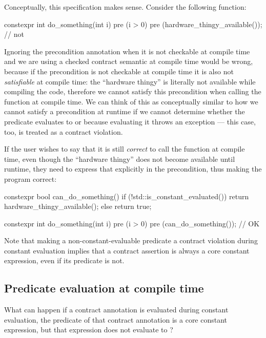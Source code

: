 Conceptually, this specification makes sense. Consider the following function:

\begin{codeblock}
constexpr int do_something(int i)
  pre (i > 0)
  pre (hardware_thingy_available());  // not 
\end{codeblock}

Ignoring the precondition annotation when it is not checkable at compile time and we are using a checked contract semantic at compile time would be wrong, because if the precondition is not checkable at compile time it is also not \emph{satisfiable} at compile time: the ``hardware thingy'' is literally not available while compiling the code, therefore we cannot satisfy this precondition when calling the function at compile time. We can think of this as conceptually similar to how we cannot satisfy a precondition at runtime if we cannot determine whether the predicate evaluates to  or  because evaluating it throws an exception --- this case, too, is treated as a contract violation.

If the user wishes to say that it is still \emph{correct} to call the function at compile time, even though the ``hardware thingy'' does not become available until runtime, they need to express that explicitly in the precondition, thus making the program correct:

\begin{codeblock}
constexpr bool can_do_something() {
  if (!std::is_constant_evaluated())
    return hardware_thingy_available();
  else
    return true;
}

constexpr int do_something(int i)
  pre (i > 0)
  pre (can_do_something());  // OK
\end{codeblock}

Note that making a non-constant-evaluable predicate a contract violation during constant evaluation implies that a contract assertion is always a core constant expression, even if its predicate is not.

\subsection{Predicate evaluation at compile time}

What can happen if a contract annotation is evaluated during constant evaluation, the predicate of that contract annotation is a core constant expression, but that expression does not evaluate to ?

